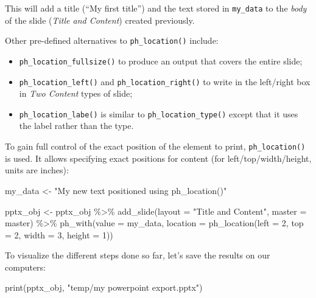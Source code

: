 \documentclass[
]{book}
\newenvironment{Shaded}{\begin{snugshade}}{\end{snugshade}}
\newcommand{\AttributeTok}[1]{\textcolor[rgb]{0.77,0.63,0.00}{#1}}
\newcommand{\DecValTok}[1]{\textcolor[rgb]{0.00,0.00,0.81}{#1}}
\newcommand{\FunctionTok}[1]{\textcolor[rgb]{0.00,0.00,0.00}{#1}}
\newcommand{\NormalTok}[1]{#1}
\newcommand{\OtherTok}[1]{\textcolor[rgb]{0.56,0.35,0.01}{#1}}
\newcommand{\SpecialCharTok}[1]{\textcolor[rgb]{0.00,0.00,0.00}{#1}}
\newcommand{\StringTok}[1]{\textcolor[rgb]{0.31,0.60,0.02}{#1}}
\providecommand{\tightlist}{%
  \setlength{\itemsep}{0pt}\setlength{\parskip}{0pt}}
\begin{document}
This will add a title (``My first title'') and the text stored in \texttt{my\_data} to the \emph{body} of the slide (\emph{Title and Content}) created previously.

Other pre-defined alternatives to \texttt{ph\_location()} include:

\begin{itemize}
\tightlist
\item
  \texttt{ph\_location\_fullsize()} to produce an output that covers the entire slide;
\item
  \texttt{ph\_location\_left()} and \texttt{ph\_location\_right()} to write in the left/right box in \emph{Two Content} types of slide;
\item
  \texttt{ph\_location\_labe()} is similar to \texttt{ph\_location\_type()} except that it uses the label rather than the type.
\end{itemize}

To gain full control of the exact position of the element to print, \texttt{ph\_location()} is used. It allows specifying exact positions for content (for left/top/width/height, units are inches):

\begin{Shaded}
\begin{Highlighting}[]
\NormalTok{my\_data }\OtherTok{\textless{}{-}} \StringTok{"My new text positioned using ph\_location()"}

\NormalTok{pptx\_obj }\OtherTok{\textless{}{-}}\NormalTok{ pptx\_obj }\SpecialCharTok{\%\textgreater{}\%}
  \FunctionTok{add\_slide}\NormalTok{(}\AttributeTok{layout =} \StringTok{"Title and Content"}\NormalTok{, }\AttributeTok{master =}\NormalTok{ master) }\SpecialCharTok{\%\textgreater{}\%} 
  \FunctionTok{ph\_with}\NormalTok{(}\AttributeTok{value =}\NormalTok{ my\_data, }\AttributeTok{location =} \FunctionTok{ph\_location}\NormalTok{(}\AttributeTok{left =} \DecValTok{2}\NormalTok{, }\AttributeTok{top =} \DecValTok{2}\NormalTok{, }\AttributeTok{width =} \DecValTok{3}\NormalTok{, }\AttributeTok{height =} \DecValTok{1}\NormalTok{))}
\end{Highlighting}
\end{Shaded}

To visualize the different steps done so far, let's save the results on our computers:

\begin{Shaded}
\begin{Highlighting}[]
\FunctionTok{print}\NormalTok{(pptx\_obj, }\StringTok{"temp/my powerpoint export.pptx"}\NormalTok{)}
\end{Highlighting}
\end{Shaded}
\end{document}
